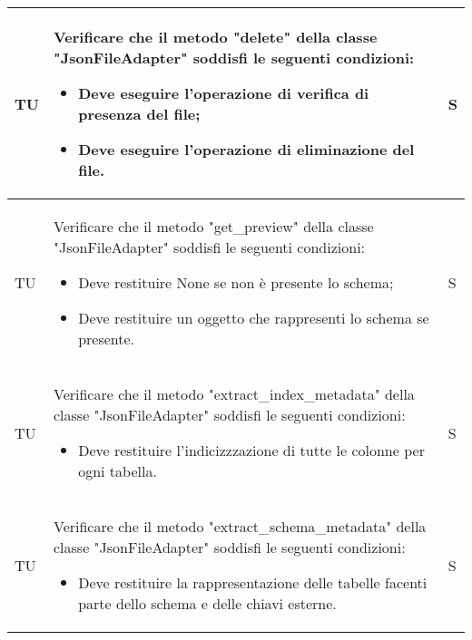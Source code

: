 \begin{adjustwidth}{-0.5cm}{-0.5cm}
\begin{longtable}{|P{1.5cm}|>{\raggedright}P{9.5cm}|>{\arraybackslash}P{1.5cm}|}
		\hline TU & Verificare che il metodo "delete" della classe "JsonFileAdapter" soddisfi le seguenti condizioni:
		\begin{itemize}
			\item Deve eseguire l'operazione di verifica di presenza del file;
			\item Deve eseguire l'operazione di eliminazione del file.
		\end{itemize} & S \\

		\hline TU & Verificare che il metodo "get\_preview" della classe "JsonFileAdapter" soddisfi le seguenti condizioni:
		\begin{itemize}
			\item Deve restituire None se non è presente lo schema;
			\item Deve restituire un oggetto che rappresenti lo schema se presente.
		\end{itemize} & S \\

		\hline TU & Verificare che il metodo "extract\_index\_metadata" della classe "JsonFileAdapter" soddisfi le seguenti condizioni:
		\begin{itemize}
			\item Deve restituire l'indicizzzazione di tutte le colonne per ogni tabella.
		\end{itemize} & S \\

		\hline TU & Verificare che il metodo "extract\_schema\_metadata" della classe "JsonFileAdapter" soddisfi le seguenti condizioni:
		\begin{itemize}
			\item Deve restituire la rappresentazione delle tabelle facenti parte dello schema e delle chiavi esterne.
		\end{itemize} & S \\


\end{longtable}
\end{adjustwidth}
